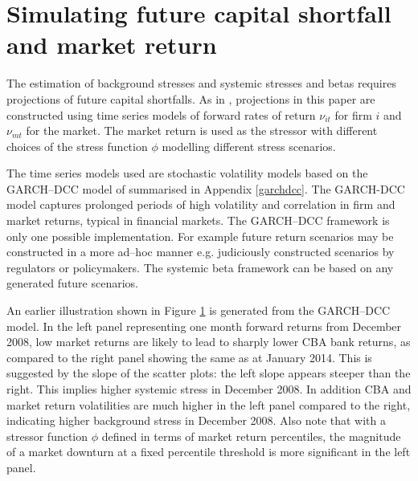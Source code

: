 \documentclass[authoryear]{elsarticle}
\newcommand{\fref}[1]{Figure \ref{#1}}
\newcommand{\aref}[1]{Appendix \ref{#1}}
\begin{document}
\section{Simulating future capital shortfall and market return}\label{simulation}



The estimation of background stresses and systemic stresses and betas requires projections of future capital shortfalls. As in \cite{brownlees2015}, projections in this paper are constructed  using time series models of forward rates of return $\nu_{it}$ for firm $i$ and $\nu_{mt}$ for the market. The market return is used as the stressor with different choices of the stress function $\phi$ modelling different stress scenarios.

The time series models used are stochastic volatility models based on the GARCH--DCC model of \cite{engle2002dynamic} summarised in \aref{garchdcc}. The GARCH-DCC model captures prolonged periods of high volatility and correlation in firm and market returns, typical in financial markets. The GARCH--DCC framework is only one possible implementation.   For example future return scenarios may be constructed in a more ad--hoc manner e.g. judiciously constructed scenarios by regulators or policymakers.   The  systemic beta framework can be based on  any  generated  future  scenarios.

An earlier illustration shown in \fref{simulation} is generated from the GARCH--DCC model.  In the left panel representing one month forward returns from December 2008, low market returns are likely to lead to sharply lower CBA bank returns, as compared to the right panel showing the same as at January 2014.   This is suggested by the slope of the scatter plots:  the left slope appears steeper than the right. This implies higher systemic stress in December 2008. In addition CBA and market return volatilities are much higher in the left panel compared to the right, indicating higher background stress in December 2008. Also note that with a stressor function $\phi$ defined in terms of market return percentiles, the magnitude of a market downturn at a fixed percentile threshold is more significant in the left panel.

\end{document}
